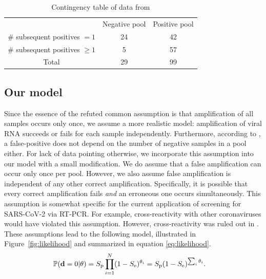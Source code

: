 \documentclass{article}
\begin{document}
\begin{table}[h]
\centering
\begin{tabular}{ c c c }
                                & Negative pool  & Positive pool \\%
\# subsequent positives $=1$    & 24             & 42            \\%
\# subsequent positives $\geq1$ & 5              & 57            \\%
 Total                          & 29             & 99            \\%
\end{tabular}
\caption{Contingency table of data from \cite{Salazar}}\label{table}
\end{table}


\subsection*{Our model}\label{subsec:ours}
Since the essence of the refuted common assumption is that
amplification of all samples occurs only once, we assume a more
realistic model: amplification of viral RNA succeeds or fails for each
sample independently. Furthermore, according to \cite{Simplistic1,
  Simplistic2, Kim, OptimalDorfmanPool}, a false-positive does not
depend on the number of negative samples in a pool either. For lack of
data pointing otherwise, we incorporate this assumption into our model
with a small modification. We do assume that a false amplification can
occur only once per pool. However, we also assume false amplification
is independent of any other correct amplification. Specifically, it is
possible that every correct amplification fails \emph{and} an
erroneous one occurs simultaneously. This assumption is somewhat
specific for the current application of screening for SARS-CoV-2 via
RT-PCR. For example, cross-reactivity with other coronaviruses would
have violated this assumption. However, cross-reactivity was ruled out
in \cite{KitComparison}. These assumptions lead to the following
model, illustrated in Figure~\ref{fig:likelihood} and summarized in
equation \eqref{eq:likelihood}.
\begin{align}\label{eq:likelihood}
    \mathbb{P}(\mathbf{d}=0 | \theta) &= S_{\text{p}}\prod_{i=1}^N (1-S_{\text{e}})^{\theta_i} =
    S_{\text{p}}(1-S_\text{e})^{\sum_i\theta_i}.
\end{align}
\end{document}
